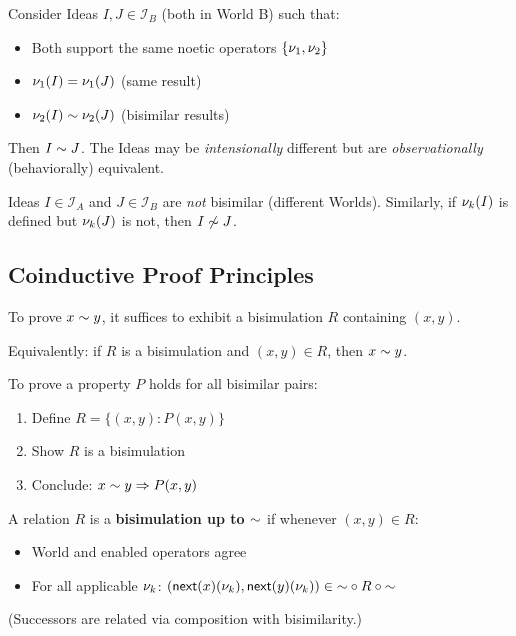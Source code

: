 \begin{example}
\label{ex:bisimilar-ideas}
Consider Ideas $I, J \in \mathcal{I}_B$ (both in World B) such that:
\begin{itemize}
  \item Both support the same noetic operators $\{\nu_{1}, \nu_{2}\}$
  \item $\nu_{1}(I) = \nu_{1}(J)$ (same result)
  \item $\nu_{2}(I) \sim \nu_{2}(J)$ (bisimilar results)
\end{itemize}
Then $I \sim J$. The Ideas may be \emph{intensionally} different but are
\emph{observationally} (behaviorally) equivalent.
\end{example}

\begin{example}
\label{ex:non-bisimilar-ideas}
Ideas $I \in \mathcal{I}_A$ and $J \in \mathcal{I}_B$ are \emph{not} bisimilar
(different Worlds). Similarly, if $\nu_{k}(I)$ is defined but $\nu_{k}(J)$ is not,
then $I \not\sim J$.
\end{example}

\subsection{Coinductive Proof Principles}
\label{subsec:coinductive-proofs}

\begin{theorem}
\label{thm:coinduction}
To prove $x \sim y$, it suffices to exhibit a bisimulation $R$ containing $(x, y)$.

Equivalently: if $R$ is a bisimulation and $(x, y) \in R$, then $x \sim y$.
\end{theorem}

\begin{corollary}
\label{cor:coinductive-method}
To prove a property $P$ holds for all bisimilar pairs:
\begin{enumerate}
  \item Define $R = \{(x, y) : P(x, y)\}$
  \item Show $R$ is a bisimulation
  \item Conclude: $x \sim y \Rightarrow P(x, y)$
\end{enumerate}
\end{corollary}

\begin{definition}[Bisimulation Up-To]
\label{def:bisim-up-to}
A relation $R$ is a \textbf{bisimulation up to $\sim$} if whenever $(x, y) \in R$:
\begin{itemize}
  \item World and enabled operators agree
  \item For all applicable $\nu_{k}$: $(\mathsf{next}(x)(\nu_{k}), \mathsf{next}(y)(\nu_{k})) \in {\sim} \circ R \circ {\sim}$
\end{itemize}
(Successors are related via composition with bisimilarity.)
\end{definition}

